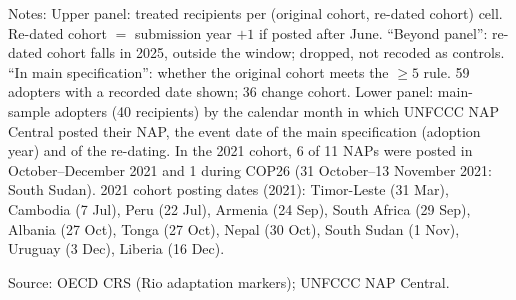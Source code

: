 \begin{table}[H]
{}
\par\vspace{4pt}
\begin{minipage}{\linewidth}\footnotesize
Notes: Upper panel: treated recipients per (original cohort, re-dated cohort) cell. Re-dated cohort $=$ submission year $+1$ if posted after June. ``Beyond panel'': re-dated cohort falls in 2025, outside the window; dropped, not recoded as controls. ``In main specification'': whether the original cohort meets the $\geq 5$ rule. 59 adopters with a recorded date shown; 36 change cohort. Lower panel: main-sample adopters (40 recipients) by the calendar month in which UNFCCC NAP Central posted their NAP, the event date of the main specification (adoption year) and of the re-dating. In the 2021 cohort, 6 of 11 NAPs were posted in October--December 2021 and 1 during COP26 (31 October--13 November 2021: South Sudan). 2021 cohort posting dates (2021): Timor-Leste (31 Mar), Cambodia (7 Jul), Peru (22 Jul), Armenia (24 Sep), South Africa (29 Sep), Albania (27 Oct), Tonga (27 Oct), Nepal (30 Oct), South Sudan (1 Nov), Uruguay (3 Dec), Liberia (16 Dec).\par
Source: OECD CRS (Rio adaptation markers); UNFCCC NAP Central.
\end{minipage}
\end{table}
